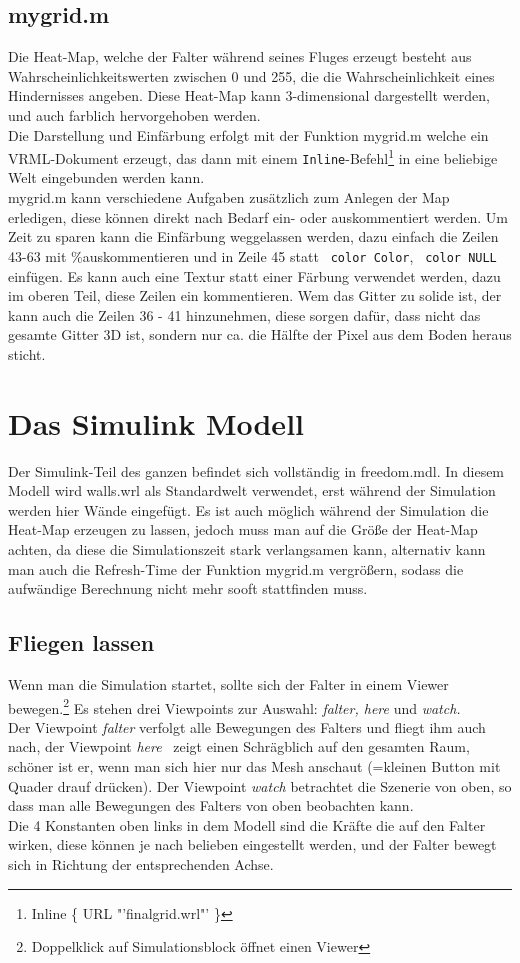 \documentclass[titlepage, a4paper, ngerman]{article}
\begin{document}
\subsection{mygrid.m}
Die Heat-Map, welche der Falter während seines Fluges erzeugt besteht aus Wahrscheinlichkeitswerten zwischen 0 und 255, die die Wahrscheinlichkeit eines Hindernisses angeben. Diese Heat-Map kann 3-dimensional dargestellt werden, und auch farblich hervorgehoben werden.\\
Die Darstellung und Einfärbung erfolgt mit der Funktion mygrid.m welche ein VRML-Dokument erzeugt, das dann mit einem \verb|Inline|-Befehl\footnote{Inline \{ URL "'finalgrid.wrl"' \}}  in eine beliebige Welt eingebunden werden kann. \\
mygrid.m kann verschiedene Aufgaben zusätzlich zum Anlegen der Map erledigen, diese können direkt nach Bedarf ein- oder auskommentiert werden. 
Um Zeit zu sparen kann die Einfärbung weggelassen werden, dazu einfach die Zeilen 43-63 mit \glq\%\grq auskommentieren und in Zeile 45 statt \verb| color Color|, \verb| color NULL| einfügen. Es kann auch eine Textur statt einer Färbung verwendet werden, dazu im oberen Teil, diese Zeilen ein kommentieren. Wem das Gitter zu solide ist, der kann auch die Zeilen 36 - 41 hinzunehmen, diese sorgen dafür, dass nicht das gesamte Gitter 3D ist, sondern nur ca. die Hälfte der Pixel aus dem Boden heraus sticht.

\section{Das Simulink Modell}
Der Simulink-Teil des ganzen befindet sich vollständig in freedom.mdl. In diesem Modell wird walls.wrl als Standardwelt verwendet, erst während der Simulation werden hier Wände eingefügt. Es ist auch möglich während der Simulation die Heat-Map erzeugen zu lassen, jedoch muss man auf die Größe der Heat-Map achten, da diese die Simulationszeit stark verlangsamen kann, alternativ kann man auch die Refresh-Time der Funktion mygrid.m vergrößern, sodass die aufwändige Berechnung nicht mehr sooft stattfinden muss.

\subsection{Fliegen lassen}
Wenn man die Simulation startet, sollte sich der Falter in einem Viewer bewegen.\footnote{Doppelklick auf Simulationsblock öffnet einen Viewer} Es stehen drei Viewpoints zur Auswahl: {\em falter, here} und {\em watch.}\\
Der Viewpoint {\em falter} verfolgt alle Bewegungen des Falters und fliegt ihm auch nach, der Viewpoint {\em here} \ zeigt einen Schrägblich auf den gesamten Raum, schöner ist er, wenn man sich hier nur das Mesh anschaut (=kleinen Button mit Quader drauf drücken). Der Viewpoint {\em watch} betrachtet die Szenerie von oben, so dass man alle Bewegungen des Falters von oben beobachten kann.\\
Die 4 Konstanten oben links in dem Modell sind die Kräfte die auf den Falter wirken, diese können je nach belieben eingestellt werden, und der Falter bewegt sich in Richtung der entsprechenden Achse.
\end{document}
